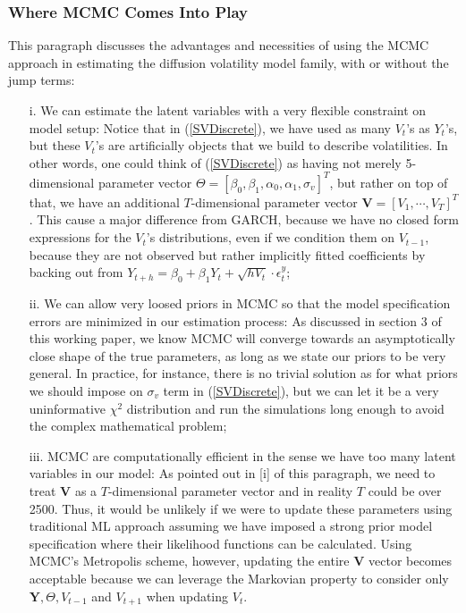 \documentclass[letterpaper]{article}
\newcommand{\YY}{\mathbf{Y}}
\begin{document}
	\subsubsection{Where MCMC Comes Into Play}
	This paragraph discusses the advantages and necessities of using the MCMC approach in estimating the diffusion volatility model family, with or without the jump terms:
	\begin{itemize}
		\item[i.] We can estimate the latent variables with a very flexible constraint on model setup:
		Notice that in (\ref{SVDiscrete}), we have used as many $V_t$'s as $Y_t$'s, but these $V_t$'s are artificially objects that we build to describe volatilities. In other words, one could think of (\ref{SVDiscrete}) as having not merely 5-dimensional parameter vector $\Theta=[\beta_0,\beta_1,\alpha_0,\alpha_1,\sigma_v]^T$, but rather on top of that, we have an additional $T$-dimensional parameter vector $\mathbf{V}=[V_1,\cdots,V_T]^T$. This cause a major difference from GARCH, because we have no closed form expressions for the $V_t$'s distributions, even if we condition them on $V_{t-1}$, because they are not observed but rather implicitly fitted coefficients by backing out from $Y_{t+h}=\beta_0+\beta_1Y_t+\sqrt{hV_t}\cdot\epsilon_t^y$;
		\item[ii.] We can allow very loosed priors in MCMC so that the model specification errors are minimized in our estimation process: As discussed in section 3 of this working paper, we know MCMC will converge towards an asymptotically close shape of the true parameters, as long as we state our priors to be very general. In practice, for instance, there is no trivial solution as for what priors we should impose on $\sigma_v$ term in (\ref{SVDiscrete}), but we can let it be a very uninformative $\chi^2$ distribution and run the simulations long enough to avoid the complex mathematical problem;
		\item[iii.] MCMC are computationally efficient in the sense we have too many latent variables in our model: As pointed out in [i] of this paragraph, we need to treat $\mathbf{V}$ as a $T$-dimensional parameter vector and in reality $T$ could be over 2500. Thus, it would be unlikely if we were to update these parameters using traditional ML approach assuming we have imposed a strong prior model specification where their likelihood functions can be calculated. Using MCMC's Metropolis scheme, however, updating the entire $\mathbf{V}$ vector becomes acceptable because we can leverage the Markovian property to consider only $\YY,\Theta,V_{t-1}$ and $V_{t+1}$ when updating $V_t$.
	\end{itemize}
\end{document}
